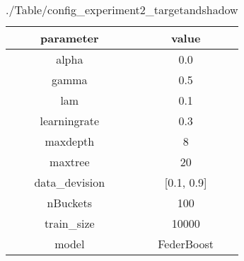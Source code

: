 \begin{table}[h]
\centering
\begin{tabular}{|c|c|}
\hline
parameter & value\\
\hline
alpha & 0.0 \\\hline
gamma & 0.5 \\\hline
lam & 0.1 \\\hline
learningrate & 0.3 \\\hline
maxdepth & 8 \\\hline
maxtree & 20 \\\hline
data_devision & [0.1, 0.9] \\\hline
nBuckets & 100 \\\hline
train_size & 10000 \\\hline
model & FederBoost \\\hline

\end{tabular}\caption{./Table/config_experiment2_targetandshadow}
\label{tab:./Table/config_experiment2_targetandshadow}
\end{table}
